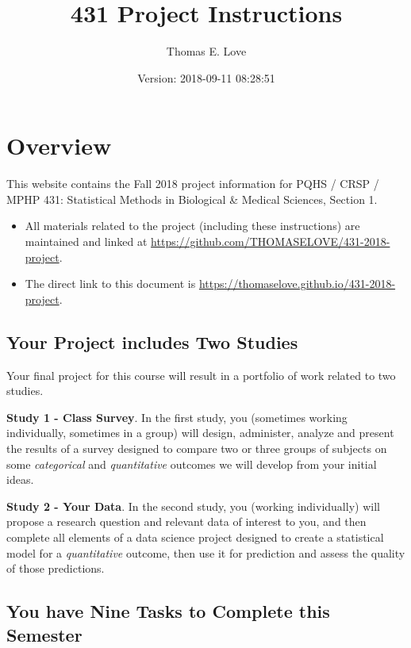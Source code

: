 \documentclass[]{book}
\title{431 Project Instructions}
\author{Thomas E. Love}
\date{Version: 2018-09-11 08:28:51}
\providecommand{\tightlist}{%
  \setlength{\itemsep}{0pt}\setlength{\parskip}{0pt}}
\theoremstyle{definition}
\theoremstyle{definition}
\theoremstyle{definition}
\theoremstyle{remark}
\begin{document}
\maketitle

{
\setcounter{tocdepth}{1}
\tableofcontents
}
\hypertarget{overview}{%
\chapter*{Overview}\label{overview}}

This website contains the Fall 2018 project information for PQHS / CRSP
/ MPHP 431: Statistical Methods in Biological \& Medical Sciences,
Section 1.

\begin{itemize}
\tightlist
\item
  All materials related to the project (including these instructions)
  are maintained and linked at
  \url{https://github.com/THOMASELOVE/431-2018-project}.
\item
  The direct link to this document is
  \url{https://thomaselove.github.io/431-2018-project}.
\end{itemize}

\hypertarget{your-project-includes-two-studies}{%
\section*{Your Project includes Two
Studies}\label{your-project-includes-two-studies}}

Your final project for this course will result in a portfolio of work
related to two studies.

\textbf{Study 1 - Class Survey}. In the first study, you (sometimes
working individually, sometimes in a group) will design, administer,
analyze and present the results of a survey designed to compare two or
three groups of subjects on some \emph{categorical} and
\emph{quantitative} outcomes we will develop from your initial ideas.

\textbf{Study 2 - Your Data}. In the second study, you (working
individually) will propose a research question and relevant data of
interest to you, and then complete all elements of a data science
project designed to create a statistical model for a \emph{quantitative}
outcome, then use it for prediction and assess the quality of those
predictions.

\hypertarget{you-have-nine-tasks-to-complete-this-semester}{%
\section*{You have Nine Tasks to Complete this
Semester}\label{you-have-nine-tasks-to-complete-this-semester}}
\end{document}
